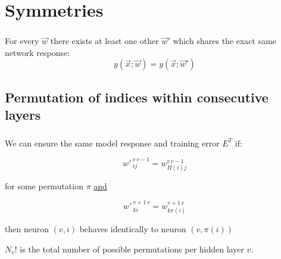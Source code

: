 \section{Symmetries}


\begin{frame}\frametitle{\secname}

For every $\vec w$ there exists at least one other $\vec w'$ which shares the exact same network response:
\begin{equation}
y(\vec x; \vec w) = y(\vec x; \vec w')
\label{eq:symmetric}
\end{equation}

\pause

  
\end{frame}

\subsection{Permutation of indices within consecutive layers}

\begin{frame}\frametitle{\subsecname}


We can ensure the same model response and training error $E^{T}$ if:


\begin{equation}
{w'\,}^{v\,v-1}_{ij} = w^{v\,v-1}_{\Pi(i)j}
\end{equation}

for some permutation $\pi$ \underline{and}

\begin{equation}
{w'\,}^{v+1\,v}_{ki} = w^{v+1\,v}_{k\pi(i)}
\end{equation}

then neuron $(v, i)$ behaves identically to neuron $(v, \pi(i))${}

$N_{v}!$ is the total number of possible permutations per hidden layer $v$.

  
\end{frame}

